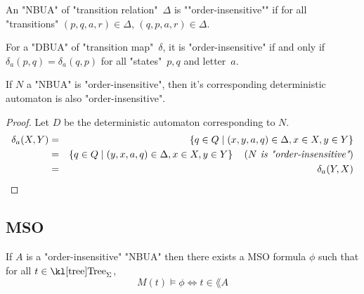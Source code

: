 \documentclass{article}
\begin{document}
\begin{definition}
	An "NBUA" of "transition relation"~$\Delta$ is ""order-insensitive"" if for all "transitions" $(p,q,a,r) \in \Delta$,
	$(q,p,a,r) \in \Delta$.
\end{definition}

\begin{remark}
	For a "DBUA" of "transition map"~$\delta$, it is "order-insensitive" if and only if 
	$\delta_a (p,q) = \delta_a (q,p)$ for all "states"~$p,q$ and letter~$a$.
\end{remark}

\begin{lemma}
	If $N$ a "NBUA" is "order-insensitive", then it's corresponding deterministic automaton is also "order-insensitive".
\end{lemma}

\begin{proof}
	Let $D$ be the deterministic automaton corresponding to $N$.
	\begin{eqnarray*}
		\delta_a (X,Y) &=& \left\{q \in Q \mid (x,y,a,q) \in \Delta, x \in X, y \in Y\right\} \\
		&=& \left\{q \in Q \mid (y,x,a,q) \in \Delta, x \in X, y \in Y\right\}  \quad\left(\textit{$N$ is "order-insensitive"}\right) \\
		&=& \delta_a (Y,X)
	\end{eqnarray*}
\end{proof}

\subsection{MSO}

\begin{lemma}
	If $A$ is a "order-insensitive" "NBUA"  then there exists a MSO formula $\phi$ such that for all $t \in \tree_{\Sigma}$,
	\[ M(t) \models \phi \iff t \in \lang A \]
\end{lemma}
\end{document}
